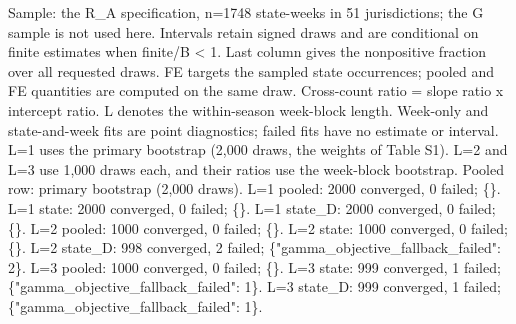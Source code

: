 \begin{minipage}{\linewidth}\footnotesize\raggedright
Sample: the R\_\allowbreak{}A specification, n=1748 state-weeks in 51 jurisdictions; the G sample is not used here. Intervals retain signed draws and are conditional on finite estimates when finite/B < 1. Last column gives the nonpositive fraction over all requested draws. FE targets the sampled state occurrences; pooled and FE quantities are computed on the same draw. Cross-count ratio = slope ratio x intercept ratio. L denotes the within-season week-block length. Week-only and state-and-week fits are point diagnostics; failed fits have no estimate or interval. L=1 uses the primary bootstrap (2,000 draws, the weights of Table S1). L=2 and L=3 use 1,000 draws each, and their ratios use the week-block bootstrap. Pooled row: primary bootstrap (2,000 draws). L=1 pooled: 2000 converged, 0 failed; \{\}. L=1 state: 2000 converged, 0 failed; \{\}. L=1 state\_\allowbreak{}D: 2000 converged, 0 failed; \{\}. L=2 pooled: 1000 converged, 0 failed; \{\}. L=2 state: 1000 converged, 0 failed; \{\}. L=2 state\_\allowbreak{}D: 998 converged, 2 failed; \{"gamma\_\allowbreak{}objective\_\allowbreak{}fallback\_\allowbreak{}failed": 2\}. L=3 pooled: 1000 converged, 0 failed; \{\}. L=3 state: 999 converged, 1 failed; \{"gamma\_\allowbreak{}objective\_\allowbreak{}fallback\_\allowbreak{}failed": 1\}. L=3 state\_\allowbreak{}D: 999 converged, 1 failed; \{"gamma\_\allowbreak{}objective\_\allowbreak{}fallback\_\allowbreak{}failed": 1\}.
\end{minipage}\par
\endgroup
